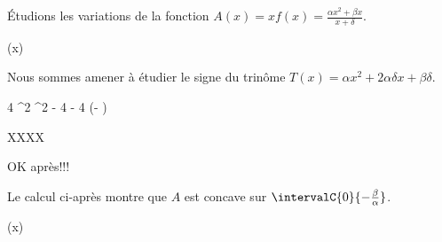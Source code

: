 Étudions les variations de la fonction
$A(x) = x f(x) =\frac{\alpha x^2 + \beta x}{x + \delta}$.

\begin{stepcalc}[style=sar]
	(x)
\explnext{}
\explnext{}
\end{stepcalc}

Nous sommes amener à étudier le signe du trinôme
$T(x) = \alpha x^2 + 2 \alpha \delta x + \beta \delta$.

\begin{stepcalc}[style=sar]
	\Delta
\explnext{}
	4 \alpha^2 \delta^2 - 4 \alpha \beta \delta
\explnext{}
	- 4 \alpha \delta (\beta - \alpha \delta)
\end{stepcalc}




XXXX











OK après!!!


\begin{remark}
	Le calcul ci-après montre que $A$ est concave sur $\intervalC{0}{- \frac{\beta}{\alpha}}$.

    \begin{stepcalc}[style=ar*]
    	(x)
    \explnext{}
    \explnext{}
    \explnext{}
    \end{stepcalc}
\end{remark}